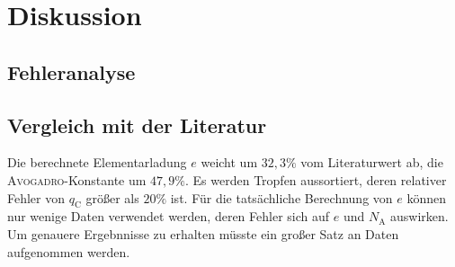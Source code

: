 \section{Diskussion}
\label{sec:Diskussion}

\subsection{Fehleranalyse}

\subsection{Vergleich mit der Literatur}

Die berechnete Elementarladung $e$ weicht um $32,3\%$ vom Literaturwert ab, die \textsc{Avogadro}-Konstante um $47,9\%$. 
Es werden Tropfen aussortiert, deren relativer Fehler von $q_\mathup{C}$ größer als $20\%$ ist. Für die tatsächliche Berechnung von $e$ können nur wenige Daten verwendet werden, deren Fehler sich auf $e$ und $N_\mathup{A}$ auswirken. Um genauere Ergebnnisse zu erhalten müsste ein großer Satz an Daten aufgenommen werden. 
